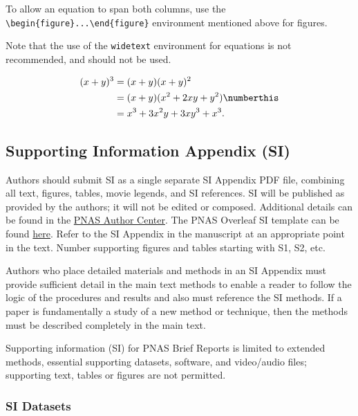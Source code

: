 \documentclass[9pt,twocolumn,twoside]{pnas-new}
\begin{document}
To allow an equation to span both columns, use the \verb|\begin{figure}...\end{figure}| environment mentioned above for figures.

Note that the use of the \verb|widetext| environment for equations is not recommended, and should not be used.

\begin{figure}[bt!]
\begin{align*}
(x+y)^3&=(x+y)(x+y)^2\\
       &=(x+y)(x^2+2xy+y^2) \numberthis \label{eqn:example2} \\
       &=x^3+3x^2y+3xy^3+x^3.
\end{align*}
\end{figure}



\subsection*{Supporting Information Appendix (SI)}

Authors should submit SI as a single separate SI Appendix PDF file, combining all text, figures, tables, movie legends, and SI references. SI will be published as provided by the authors; it will not be edited or composed. Additional details can be found in the \href{https://www.pnas.org/author-center/submitting-your-manuscript#supporting-information}{PNAS Author Center}. The PNAS Overleaf SI template can be found \href{https://www.overleaf.com/latex/templates/pnas-template-for-supplementary-information/wqfsfqwyjtsd}{here}. Refer to the SI Appendix in the manuscript at an appropriate point in the text. Number supporting figures and tables starting with S1, S2, etc.

Authors who place detailed materials and methods in an SI Appendix must provide sufficient detail in the main text methods to enable a reader to follow the logic of the procedures and results and also must reference the SI methods. If a paper is fundamentally a study of a new method or technique, then the methods must be described completely in the main text.

Supporting information (SI) for PNAS Brief Reports is limited to extended methods, essential supporting datasets, software, and video/audio files; supporting text, tables or figures are not permitted.

\subsubsection*{SI Datasets}
\end{document}
